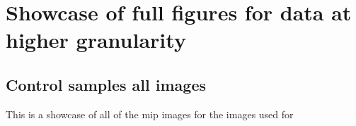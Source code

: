 \chapter{Showcase of full figures for data at higher granularity}

\section{Control samples all images}\label{app:control_im_mips}
This is a showcase of all of the \gls{mip} images for the images used for 
